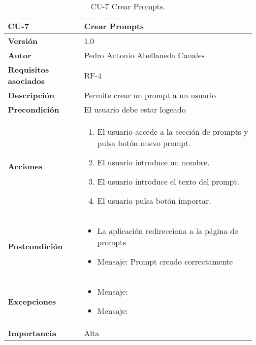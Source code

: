 \begin{table}[p]
	\centering
	\begin{tabularx}{\linewidth}{ p{} p{} }
		\toprule
		\textbf{CU-7}    & \textbf{Crear Prompts} \\
		\midrule
		\textbf{Versión}              & 1.0    \\
		\textbf{Autor}                & Pedro Antonio Abellaneda Canales \\
		\textbf{Requisitos asociados} & RF-4 \\
		\textbf{Descripción}          & Permite crear un prompt a un usuario \\
		\textbf{Precondición}         & El usuario debe estar logeado \\
		\textbf{Acciones}             &
		\begin{enumerate}
			\def\labelenumi{\arabic{enumi}.}
			\tightlist
			\item El usuario accede a la sección de prompts y pulsa botón nuevo prompt.
            \item El usuario introduce un nombre.
			\item El usuario introduce el texto del prompt.
            \item El usuario pulsa botón importar.
		\end{enumerate} \\
		\textbf{Postcondición}        
        & 
        \begin{itemize} 
            \item La aplicación redirecciona a la página de prompts 
            \item  Mensaje: Prompt creado correctamente 
        \end{itemize}  
        \\ 
		\textbf{Excepciones}          
        & 
        \begin{itemize} 
            \item Mensaje:
            \item  Mensaje:
        \end{itemize}  
        \\ 
		\textbf{Importancia}          & Alta \\
		\bottomrule
	\end{tabularx}
	\caption{CU-7 Crear Prompts.}
	\label{tab:CU-7}
\end{table}

